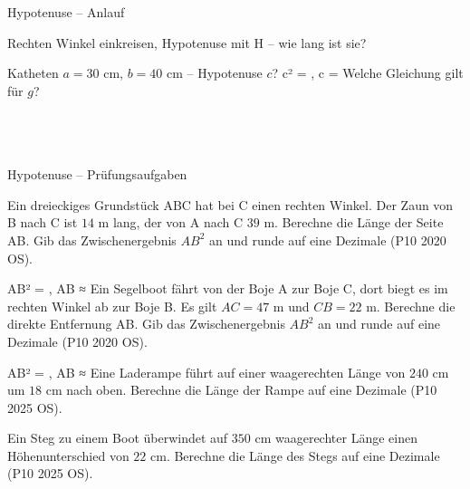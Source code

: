 \setcounter{aufgabe}{26}

\begin{aufgabe}{Hypotenuse – Anlauf}
\begin{teile}
\teil Rechten Winkel einkreisen, Hypotenuse mit H – wie lang ist sie?

\leerfeld[cm]
\teil Katheten $a = 30$ cm, $b = 40$ cm – Hypotenuse $c$? c² = \leerfeld , c = \leerfeld[cm]
\teil Welche Gleichung gilt für $g$? \\  \\  \\  \\ 

\end{teile}
\end{aufgabe}

\begin{aufgabe}{Hypotenuse – Prüfungsaufgaben}
\begin{teile}
\teil Ein dreieckiges Grundstück ABC hat bei C einen rechten Winkel. Der Zaun von B nach C ist $14$ m lang, der von A nach C $39$ m. Berechne die Länge der Seite AB. Gib das Zwischenergebnis $AB^2$ an und runde auf eine Dezimale \hfill (P10 2020 OS).

AB² = \leerfeld , AB ≈ \leerfeld[m]
\teil Ein Segelboot fährt von der Boje A zur Boje C, dort biegt es im rechten Winkel ab zur Boje B. Es gilt $AC = 47$ m und $CB = 22$ m. Berechne die direkte Entfernung AB. Gib das Zwischenergebnis $AB^2$ an und runde auf eine Dezimale \hfill (P10 2020 OS).

AB² = \leerfeld , AB ≈ \leerfeld[m]
\teil Eine Laderampe führt auf einer waagerechten Länge von $240$ cm um $18$ cm nach oben. Berechne die Länge der Rampe auf eine Dezimale \hfill (P10 2025 OS).

\leerfeld[cm]
\teil Ein Steg zu einem Boot überwindet auf $350$ cm waagerechter Länge einen Höhenunterschied von $22$ cm. Berechne die Länge des Stegs auf eine Dezimale \hfill (P10 2025 OS).

\leerfeld[cm]
\end{teile}
\end{aufgabe}

